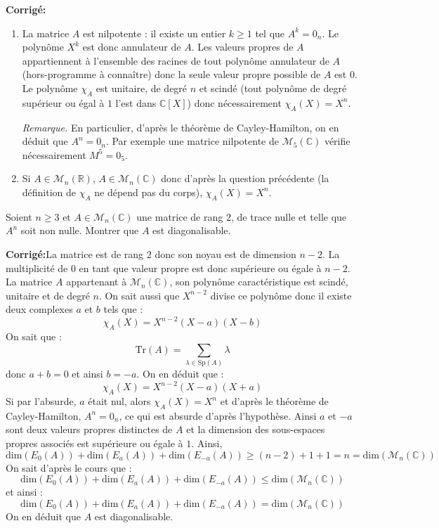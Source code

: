 \documentclass[a4paper,twoside,french,10pt]{VcCours}
\newcommand{\corr}{\textbf{Corrigé:}}
\begin{document}
\corr 

\begin{enumerate}
\item La matrice $A$ est nilpotente : il existe un entier $k \geq 1$ tel que $A^k = 0_n$. Le polynôme $X^k$ est donc annulateur de $A$. Les valeurs propres de $A$ appartiennent à l'ensemble des racines de tout polynôme annulateur de $A$ (hors-programme à connaître) donc la seule valeur propre possible de $A$ est $0$. Le polynôme $\chi_A$ est unitaire, de degré $n$ et scindé (tout polynôme de degré supérieur ou égal à $1$ l'est dans $\mathbb{C}[X]$) donc nécessairement $\chi_A(X)=X^n$.


\textit{Remarque.} En particulier, d'après le théorème de Cayley-Hamilton, on en déduit que $A^n=0_n$. Par exemple une matrice nilpotente de $\mathcal{M}_5(\mathbb{C})$ vérifie nécessairement $M^5=0_5$.
\item Si $A \in \mathcal{M}_n(\mathbb{R})$, $A \in \mathcal{M}_n(\mathbb{C})$ donc d'après la question précédente (la définition de $\chi_A$ ne dépend pas du corps), $\chi_A(X)=X^n$.
\end{enumerate}

\begin{Exercice}{} Soient $n \geq 3$ et $A \in \mathcal{M}_{n}(\mathbb{C})$ une matrice de rang $2$, de trace nulle et telle que $A^n$ soit non nulle. Montrer que $A$ est diagonalisable.
\end{Exercice}

\corr La matrice est de rang $2$ donc son noyau est de dimension $n-2$. La multiplicité de $0$ en tant que valeur propre est donc supérieure ou égale à $n-2$. La matrice $A$ appartenant à $\mathcal{M}_{n}(\mathbb{C})$, son polynôme caractéristique est scindé, unitaire et de degré $n$. On sait aussi que $X^{n-2}$ divise ce polynôme donc il existe deux complexes $a$ et $b$ tels que :
$$ \chi_A(X)= X^{n-2} (X-a)(X-b)$$
On sait que :
$$ \textrm{Tr}(A) = \sum_{\lambda \in \textrm{Sp}(A)} \lambda$$
donc $a+b=0$ et ainsi $b=-a$. On en déduit que :
$$ \chi_A(X)= X^{n-2} (X-a)(X+a)$$
Si par l'absurde, $a$ était nul, alors $\chi_A(X)=X^n$ et d'après le théorème de Cayley-Hamilton, $A^n= 0_n$, ce qui est absurde d'après l'hypothèse. Ainsi $a$ et $-a$ sont deux valeurs propres distinctes de $A$ et la dimension des sous-espaces propres associés est supérieure ou égale à $1$. Ainsi,
$$ \textrm{dim}(E_0(A)) + \textrm{dim}(E_a(A)) + \textrm{dim}(E_{-a}(A)) \geq (n-2)+1+1 = n = \textrm{dim}(\mathcal{M}_n(\mathbb{C}))$$
On sait d'après le cours que :
$$   \textrm{dim}(E_0(A)) + \textrm{dim}(E_a(A)) + \textrm{dim}(E_{-a}(A)) \leq \textrm{dim}(\mathcal{M}_n(\mathbb{C}))$$
et ainsi :
$$   \textrm{dim}(E_0(A)) + \textrm{dim}(E_a(A)) + \textrm{dim}(E_{-a}(A)) = \textrm{dim}(\mathcal{M}_n(\mathbb{C}))$$
On en déduit que $A$ est diagonalisable.
\end{document}

